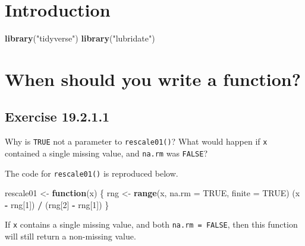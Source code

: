 \documentclass[]{book}
\newenvironment{Shaded}{\begin{snugshade}}{\end{snugshade}}
\newcommand{\ControlFlowTok}[1]{\textcolor[rgb]{0.13,0.29,0.53}{\textbf{#1}}}
\newcommand{\DataTypeTok}[1]{\textcolor[rgb]{0.13,0.29,0.53}{#1}}
\newcommand{\DecValTok}[1]{\textcolor[rgb]{0.00,0.00,0.81}{#1}}
\newcommand{\KeywordTok}[1]{\textcolor[rgb]{0.13,0.29,0.53}{\textbf{#1}}}
\newcommand{\NormalTok}[1]{#1}
\newcommand{\OperatorTok}[1]{\textcolor[rgb]{0.81,0.36,0.00}{\textbf{#1}}}
\newcommand{\OtherTok}[1]{\textcolor[rgb]{0.56,0.35,0.01}{#1}}
\newcommand{\StringTok}[1]{\textcolor[rgb]{0.31,0.60,0.02}{#1}}
\theoremstyle{plain}
\theoremstyle{remark}
\begin{document}
\hypertarget{introduction-12}{%
\section{Introduction}\label{introduction-12}}

\begin{Shaded}
\begin{Highlighting}[]
\KeywordTok{library}\NormalTok{(}\StringTok{"tidyverse"}\NormalTok{)}
\KeywordTok{library}\NormalTok{(}\StringTok{"lubridate"}\NormalTok{)}
\end{Highlighting}
\end{Shaded}

\hypertarget{when-should-you-write-a-function}{%
\section{When should you write a function?}\label{when-should-you-write-a-function}}

\hypertarget{exercise-19.2.1.1}{%
\subsection*{\texorpdfstring{Exercise {19.2.1.1}}{Exercise 19.2.1.1}}\label{exercise-19.2.1.1}}

Why is \texttt{TRUE} not a parameter to \texttt{rescale01()}?
What would happen if \texttt{x} contained a single missing value, and \texttt{na.rm} was \texttt{FALSE}?

The code for \texttt{rescale01()} is reproduced below.

\begin{Shaded}
\begin{Highlighting}[]
\NormalTok{rescale01 <-}\StringTok{ }\ControlFlowTok{function}\NormalTok{(x) \{}
\NormalTok{  rng <-}\StringTok{ }\KeywordTok{range}\NormalTok{(x, }\DataTypeTok{na.rm =} \OtherTok{TRUE}\NormalTok{, }\DataTypeTok{finite =} \OtherTok{TRUE}\NormalTok{)}
\NormalTok{  (x }\OperatorTok{-}\StringTok{ }\NormalTok{rng[}\DecValTok{1}\NormalTok{]) }\OperatorTok{/}\StringTok{ }\NormalTok{(rng[}\DecValTok{2}\NormalTok{] }\OperatorTok{-}\StringTok{ }\NormalTok{rng[}\DecValTok{1}\NormalTok{])}
\NormalTok{\}}
\end{Highlighting}
\end{Shaded}

If \texttt{x} contains a single missing value, and both \texttt{na.rm\ =\ FALSE}, then this function
will still return a non-missing value.
\end{document}

